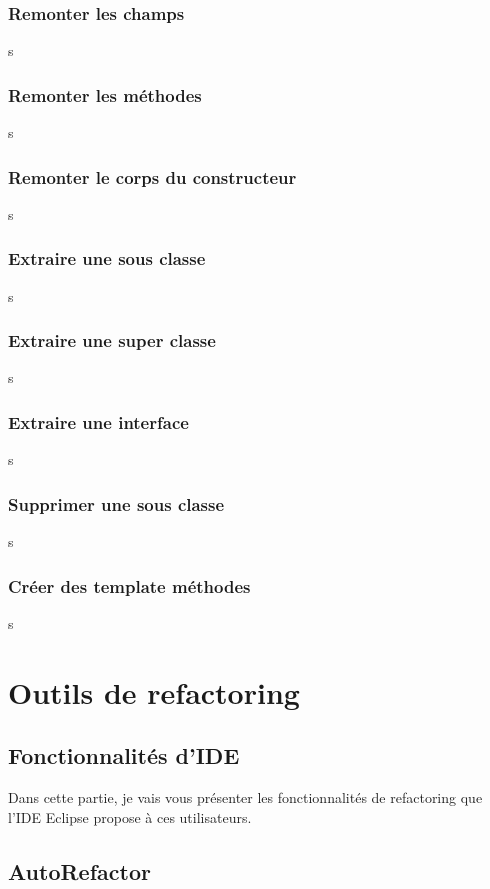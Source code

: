\documentclass[a4paper,twoside,12pt,openright]{report}
\begin{document}
\subsection{Remonter les champs}
s
\subsection{Remonter les méthodes}
s
\subsection{Remonter le corps du constructeur}
s
\subsection{Extraire une sous classe}
s
\subsection{Extraire une super classe}
s
\subsection{Extraire une interface}
s
\subsection{Supprimer une sous classe}
s
\subsection{Créer des template méthodes}
s

\chapter{Outils de refactoring}
\section{Fonctionnalités d'IDE}
Dans cette partie, je vais vous présenter les fonctionnalités de refactoring que l'IDE Eclipse propose à ces utilisateurs.


\section{AutoRefactor}
\end{document}
